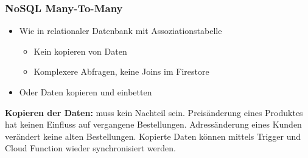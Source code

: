\subsubsection{NoSQL Many-To-Many}
\begin{itemize}
    \item Wie in relationaler Datenbank mit Assoziationstabelle
    \begin{itemize}
        \item Kein kopieren von Daten
        \item Komplexere Abfragen, keine Joins im Firestore
    \end{itemize}
    \item Oder Daten kopieren und einbetten
\end{itemize}
\textbf{Kopieren der Daten:} muss kein Nachteil sein.
Preisänderung eines Produktes hat keinen Einfluss auf vergangene Bestellungen.
Adressänderung eines Kunden verändert keine alten Bestellungen.
Kopierte Daten können mittels Trigger und Cloud Function wieder synchronisiert werden.